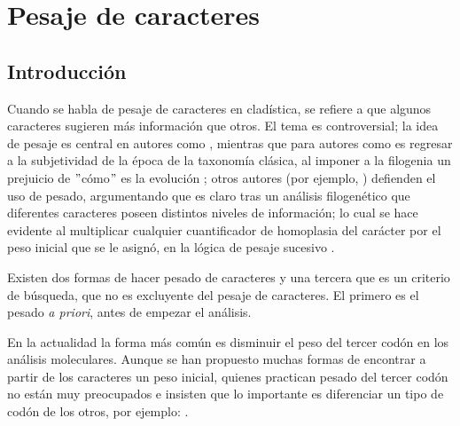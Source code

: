 \chapter{Pesaje de caracteres}
\section*{Introducci\'on}
Cuando se habla de pesaje de caracteres en clad\'istica, se refiere a que algunos caracteres sugieren m\'as informaci\'on que otros. El tema es controversial;
la idea de pesaje es central en autores como  \cite{Neff1986}, mientras que para autores como \cite{Kluge1997} es regresar a la subjetividad de la \'epoca de la taxonom\'ia cl\'asica, al imponer a la filogenia un prejuicio de $"$c\'omo$"$ es la evoluci\'on \cite{Kluge1997}; 
otros autores (por ejemplo, 
\cite{Goloboff1993,Goloboff1995}) 
defienden el uso de pesado, argumentando que es claro tras un an\'alisis filogen\'etico que diferentes caracteres poseen distintos niveles de  informaci\'on; lo cual se hace evidente al multiplicar cualquier cuantificador de homoplasia del car\'acter por el peso inicial que se le asign\'o, en la l\'ogica de pesaje sucesivo 
\cite{KlugeFarris1969}.

Existen dos formas de hacer pesado de caracteres y una tercera que es un criterio de b\'usqueda, que no es  excluyente del pesaje de caracteres. El primero es el pesado \textit{a priori}, antes de empezar el an\'alisis. 

En la actualidad la forma m\'as com\'un es disminuir el peso del tercer cod\'on en los an\'alisis moleculares. Aunque se han propuesto muchas formas de encontrar a partir de los caracteres un peso inicial, quienes practican pesado del tercer cod\'on no est\'an muy preocupados e insisten que lo importante es diferenciar un tipo de cod\'on de los otros, por ejemplo:  
\cite{Springer2001,Strugnell2014}.


